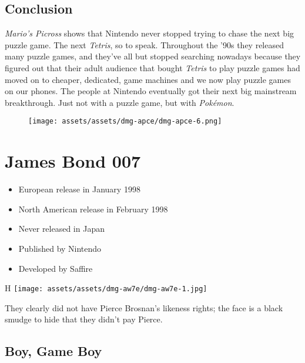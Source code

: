 \documentclass{book}
\begin{document}
\FloatBarrier\needspace{10mm}\section*{Conclusion}\nopagebreak[4]

\emph{Mario’s Picross} shows that Nintendo never stopped trying to chase the next big puzzle game. The next \emph{Tetris}, so to speak. Throughout the ’90s they released many puzzle games, and they’ve all but stopped searching nowadays because they figured out that their adult audience that bought \emph{Tetris} to play puzzle games had moved on to cheaper, dedicated, game machines and we now play puzzle games on our phones. The people at Nintendo eventually got their next big mainstream breakthrough. Just not with a puzzle game, but with \emph{Pokémon}.

\begin{figure}[hbt]
\vskip 10pt
\centering \texttt{[image: assets/assets/dmg-apce/dmg-apce-6.png]}
\vskip 6pt
\end{figure}


\begingroup \chapter*{James Bond 007} \endgroup

\begin{itemize} \setlength\itemsep{-0.4em}
\item European release in January 1998
\item North American release in February 1998
\item Never released in Japan
\item Published by Nintendo
\item Developed by Saffire
\end{itemize}\noindent

\begin{wrapfigure}{H}{\linewidth}
\vskip 4pt
\centering \texttt{[image: assets/assets/dmg-aw7e/dmg-aw7e-1.jpg]}\par\pagetwodescription They clearly did not have Pierce Brosnan’s likeness rights; the face is a black smudge to hide that they didn’t pay Pierce.\end{wrapfigure}
\clearpage

\FloatBarrier\needspace{10mm}\section*{Boy, Game Boy}\nopagebreak[4]
\end{document}
